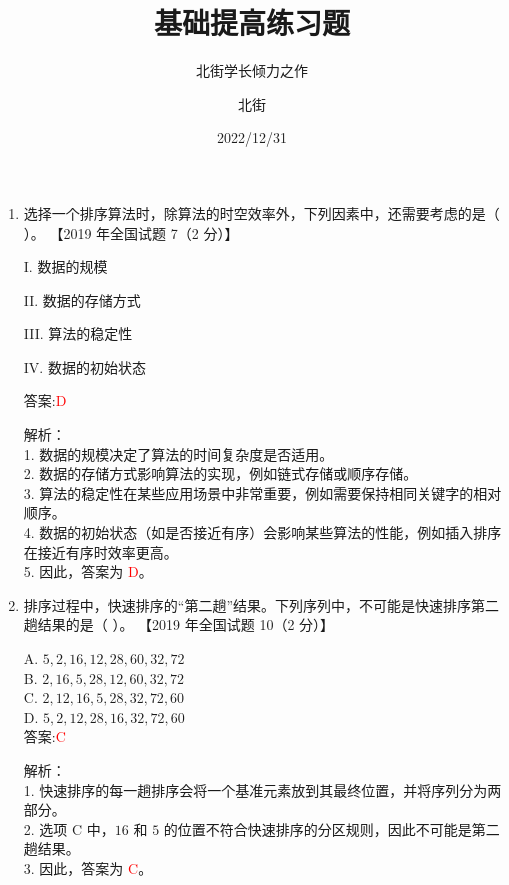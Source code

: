 \documentclass[lang=cn,newtx,10pt,scheme=chinese]{../../../elegantbook}
\title{基础提高练习题}
\subtitle{北街学长倾力之作}
\author{北街}
\date{2022/12/31}
\begin{document}
\maketitle
\frontmatter

\tableofcontents

\mainmatter



\begin{enumerate}
    \item 选择一个排序算法时，除算法的时空效率外，下列因素中，还需要考虑的是（ ）。  
    【2019 年全国试题 7（2 分）】  

    I. 数据的规模  

    II. 数据的存储方式  

    III. 算法的稳定性  

    IV. 数据的初始状态  

    答案:\textcolor{red}{D}

    解析：\\
    1. 数据的规模决定了算法的时间复杂度是否适用。\\
    2. 数据的存储方式影响算法的实现，例如链式存储或顺序存储。\\
    3. 算法的稳定性在某些应用场景中非常重要，例如需要保持相同关键字的相对顺序。\\
    4. 数据的初始状态（如是否接近有序）会影响某些算法的性能，例如插入排序在接近有序时效率更高。\\
    5. 因此，答案为 \textcolor{red}{D}。\\

\item 排序过程中，快速排序的“第二趟”结果。下列序列中，不可能是快速排序第二趟结果的是（ ）。  
    【2019 年全国试题 10（2 分）】  

    A. $5, 2, 16, 12, 28, 60, 32, 72$ \\  
    B. $2, 16, 5, 28, 12, 60, 32, 72$ \\  
    C. $2, 12, 16, 5, 28, 32, 72, 60$ \\  
    D. $5, 2, 12, 28, 16, 32, 72, 60$ \\  

    答案:\textcolor{red}{C}

    解析：\\
    1. 快速排序的每一趟排序会将一个基准元素放到其最终位置，并将序列分为两部分。\\
    2. 选项 C 中，$16$ 和 $5$ 的位置不符合快速排序的分区规则，因此不可能是第二趟结果。\\
    3. 因此，答案为 \textcolor{red}{C}。\\


\end{enumerate}
\end{document}
